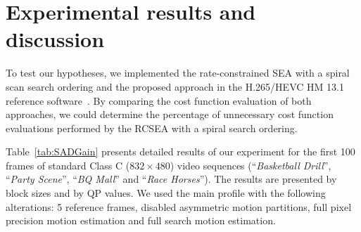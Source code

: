 \documentclass{article}
\begin{document}
\section{Experimental results and discussion}

\label{sec:results}
To test our hypotheses, we implemented the rate-constrained SEA with a spiral scan search ordering and the proposed approach in the H.265/HEVC HM 13.1 reference software~\cite{McCann2014}. By comparing the cost function evaluation of both approaches, we could determine the percentage of unnecessary cost function evaluations performed by the RCSEA with a spiral search ordering.

Table~\ref{tab:SADGain} presents detailed results of our experiment for the first 100 frames of standard Class C ($832\!\times\!480$) video sequences (``\textit{Basketball Drill}'', ``\textit{Party Scene}'', ``\textit{BQ Mall}'' and ``\textit{Race Horses}''). The results are presented by block sizes and by QP values. We used the main profile with the following alterations: 5 reference frames, disabled asymmetric motion partitions, full pixel precision motion estimation and full search motion estimation.
\end{document}
